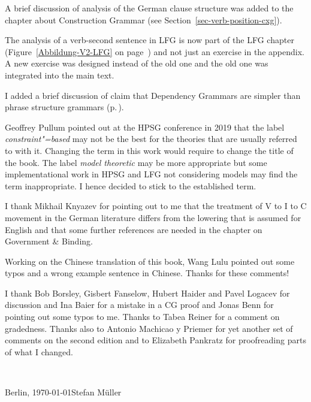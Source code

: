 A brief discussion of  analysis of the German clause structure was added to the
chapter about Construction Grammar (see Section~\ref{sec-verb-position-cxg}).

The analysis of a verb-second sentence in LFG is now part of the LFG chapter
(Figure~\ref{Abbildung-V2-LFG} on page~\pageref{Abbildung-V2-LFG}) and not just an
exercise in the appendix. A new exercise was designed instead of the old one and the old one was
integrated into the main text.

I added a brief discussion of  claim that Dependency Grammars are simpler than
phrase structure grammars (p.\,\pageref{page-simplicity-dg}).

Geoffrey Pullum pointed out at the HPSG conference in 2019 that the label \emph{constraint"=based}
may not be the best for the theories that are usually referred to with it. Changing the term in
this work would require to change the title of the book. The label \emph{model theoretic} may be
more appropriate but some implementational work in HPSG and LFG not considering models may find the
term inappropriate. I hence decided to stick to the established term.

I thank Mikhail Knyazev for pointing out to me that the treatment of V to I to C movement in the
German literature differs from the lowering that is assumed for English and that some further
references are needed in the chapter on Government \& Binding. 

Working on the Chinese translation of this book, Wang Lulu pointed out some
typos and a wrong example sentence in Chinese. Thanks for these comments! 

I thank Bob Borsley, Gisbert Fanselow, Hubert Haider and Pavel Logacev for discussion and Ina Baier for a mistake
in a CG proof and Jonas Benn for pointing out some typos to me. Thanks to Tabea Reiner for a comment
on gradedness. Thanks also to Antonio Machicao y Priemer for yet another set of comments on the
second edition and to Elizabeth Pankratz for proofreading parts of what I changed.

~\medskip

\noindent
Berlin, \today\hfill Stefan Müller



